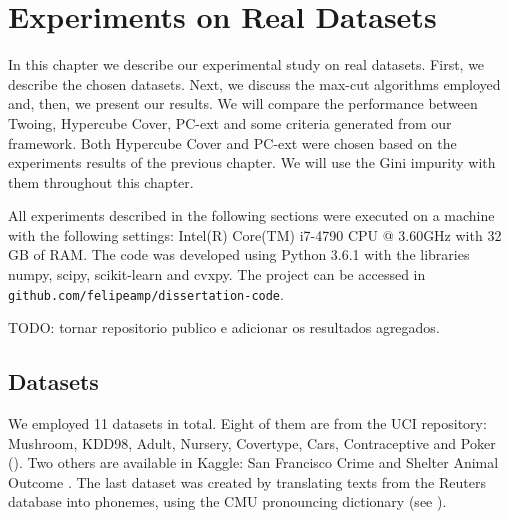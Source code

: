\newpage

\chapter{Experiments on Real Datasets}
\label{chap:experiments-datasets}


In this chapter we describe our experimental study on real datasets. First, we describe the chosen datasets. Next, we discuss the max-cut algorithms 
employed and, then, we present our results. We will compare the performance between Twoing, Hypercube Cover, PC-ext and some criteria generated from our framework. Both Hypercube Cover and PC-ext were chosen based on the experiments results of the previous chapter. We will use the Gini impurity with them throughout this chapter.

All  experiments described in the following sections were executed on a machine with the following settings: Intel(R) Core(TM) i7-4790 CPU @ 3.60GHz with 32 GB of RAM. The code was developed using Python 3.6.1 with the libraries numpy, scipy, scikit-learn and cvxpy.
The project can be accessed in {\tt github.com/felipeamp/dissertation-code}.

TODO: tornar repositorio publico e adicionar os resultados agregados.

\section{Datasets}
We employed 11 datasets in total. Eight of them are from the UCI repository:
Mushroom, KDD98, Adult, Nursery, Covertype, Cars, Contraceptive and Poker (\cite{Lichman:2013}).
Two others are available in Kaggle: San Francisco Crime and Shelter Animal Outcome
\cite{SFC,AnimalShelter}. The last dataset was created by translating texts from the Reuters database \cite{Lichman:2013} into phonemes, using the CMU pronouncing dictionary (see \cite{CMU-PD}).

